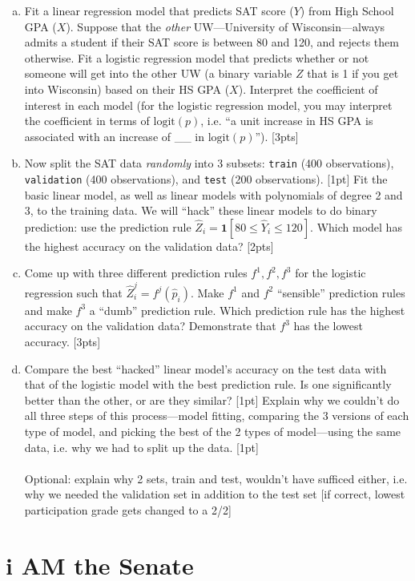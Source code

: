 \documentclass[12pt]{article}
\newcommand{\Ind}{\textbf{1}}
\newcommand{\logit}{\text{logit}}
\begin{document}
\begin{enumerate}[(a)]
	\item Fit a linear regression model that predicts SAT score ($Y$) from High School GPA ($X$). Suppose that the \textit{other} UW---University of Wisconsin---always admits a student if their SAT score is between 80 and 120, and rejects them otherwise. Fit a logistic regression model that predicts whether or not someone will get into the other UW (a binary variable $Z$ that is 1 if you get into Wisconsin) based on their HS GPA ($X$). Interpret the coefficient of interest in each model (for the logistic regression model, you may interpret the coefficient in terms of $\logit(p)$, i.e. ``a unit increase in HS GPA is associated with an increase of \_\_ in $\logit(p)$''). [3pts]
	\item Now split the SAT data \textit{randomly} into 3 subsets: \verb|train| (400 observations), \verb|validation| (400 observations), and \verb|test| (200 observations). [1pt] Fit the basic linear model, as well as linear models with polynomials of degree 2 and 3, to the training data. We will ``hack'' these linear models to do binary prediction: use the prediction rule $\hat{Z}_i = \Ind[80 \le \hat{Y}_i \le 120]$. Which model has the highest accuracy on the validation data? [2pts]
	\item Come up with three different prediction rules $f^1,f^2,f^3$ for the logistic regression such that $\hat{Z}_i^j = f^j(\hat{p}_i)$. Make $f^1$ and $f^2$ ``sensible'' prediction rules and make $f^3$ a ``dumb'' prediction rule. Which prediction rule has the highest accuracy on the validation data? Demonstrate that $f^3$ has the lowest accuracy. [3pts]
	\item Compare the best ``hacked'' linear model's accuracy on the test data with that of the logistic model with the best prediction rule. Is one significantly better than the other, or are they similar? [1pt] Explain why we couldn't do all three steps of this process---model fitting, comparing the 3 versions of each type of model, and picking the best of the 2 types of model---using the same data, i.e. why we had to split up the data. [1pt]\\\\ Optional: explain why 2 sets, train and test, wouldn't have sufficed either, i.e. why we needed the validation set in addition to the test set [if correct, lowest participation grade gets changed to a 2/2]
\end{enumerate}

\section{i AM the Senate}
\end{document}
